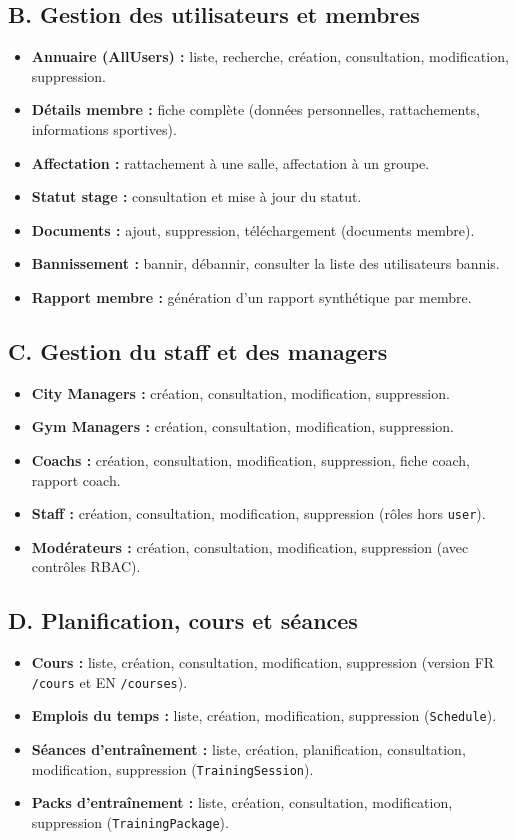 \documentclass[12pt, a4paper]{article}
\begin{document}
\subsection{B. Gestion des utilisateurs et membres}
\begin{itemize}
    \item \textbf{Annuaire (AllUsers) :} liste, recherche, création, consultation, modification, suppression.
    \item \textbf{Détails membre :} fiche complète (données personnelles, rattachements, informations sportives).
    \item \textbf{Affectation :} rattachement à une salle, affectation à un groupe.
    \item \textbf{Statut stage :} consultation et mise à jour du statut.
    \item \textbf{Documents :} ajout, suppression, téléchargement (documents membre).
    \item \textbf{Bannissement :} bannir, débannir, consulter la liste des utilisateurs bannis.
    \item \textbf{Rapport membre :} génération d'un rapport synthétique par membre.
\end{itemize}

\subsection{C. Gestion du staff et des managers}
\begin{itemize}
    \item \textbf{City Managers :} création, consultation, modification, suppression.
    \item \textbf{Gym Managers :} création, consultation, modification, suppression.
    \item \textbf{Coachs :} création, consultation, modification, suppression, fiche coach, rapport coach.
    \item \textbf{Staff :} création, consultation, modification, suppression (rôles hors \texttt{user}).
    \item \textbf{Modérateurs :} création, consultation, modification, suppression (avec contrôles RBAC).
\end{itemize}

\subsection{D. Planification, cours et séances}
\begin{itemize}
    \item \textbf{Cours :} liste, création, consultation, modification, suppression (version FR \texttt{/cours} et EN \texttt{/courses}).
    \item \textbf{Emplois du temps :} liste, création, modification, suppression (\texttt{Schedule}).
    \item \textbf{Séances d'entraînement :} liste, création, planification, consultation, modification, suppression (\texttt{TrainingSession}).
    \item \textbf{Packs d'entraînement :} liste, création, consultation, modification, suppression (\texttt{TrainingPackage}).
\end{itemize}
\end{document}
